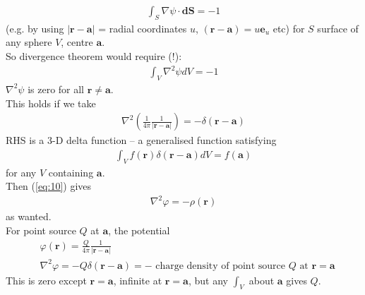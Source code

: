 \documentclass[a4paper]{article}
\begin{document}
\begin{eg}
\begin{equation*}
\begin{aligned}
\int_S \nabla\psi \cdot \mathbf{dS} = -1
\end{aligned}
\end{equation*}
(e.g. by using $|\mathbf{r}-\mathbf{a}|$ = radial coordinates $u$, $\left(\mathbf{r}-\mathbf{a}\right) = u \mathbf{e}_u$ etc) for $S$ surface of any sphere $V$, centre $\mathbf{a}$.\\
So divergence theorem would require (!):
\begin{equation*}
\begin{aligned}
\int_V \nabla^2 \psi dV = -1
\end{aligned}
\end{equation*}
$\nabla^2 \psi$ is zero for all $\mathbf{r}\neq \mathbf{a}$.\\
This holds if we take
\begin{equation*}
\begin{aligned}
\nabla^2 \left(\frac{1}{4\pi} \frac{1}{|\mathbf{r}-\mathbf{a}|}\right) = -\delta \left(\mathbf{r}-\mathbf{a}\right)
\end{aligned}
\end{equation*}
RHS is a 3-D delta function -- a generalised function satisfying
\begin{equation*}
\begin{aligned}
\int_V f\left(\mathbf{r}\right) \delta \left(\mathbf{r}-\mathbf{a}\right) dV = f\left(\mathbf{a}\right)
\end{aligned}
\end{equation*}
for any $V$ containing $\mathbf{a}$.\\
Then (\ref{eq:10}) gives
\begin{equation*}
\begin{aligned}
\nabla^2 \varphi = -\rho \left(\mathbf{r}\right) 
\end{aligned}
\end{equation*}
as wanted.\\
For point source $Q$ at $\mathbf{a}$, the potential
\begin{equation*}
\begin{aligned}
&\varphi\left(\mathbf{r}\right) = \frac{Q}{4\pi} \frac{1}{|\mathbf{r}-\mathbf{a}|}\\
&\nabla^2 \varphi = -Q\delta \left(\mathbf{r}-\mathbf{a}\right)=-\text{   charge density of point source  } Q \text{  at  } \mathbf{r} = \mathbf{a}
\end{aligned}
\end{equation*}
This is zero except $\mathbf{r}=\mathbf{a}$, infinite at $\mathbf{r}=\mathbf{a}$, but any $\int_V$ about $\mathbf{a}$ gives $Q$.
\end{eg}
\end{document}
